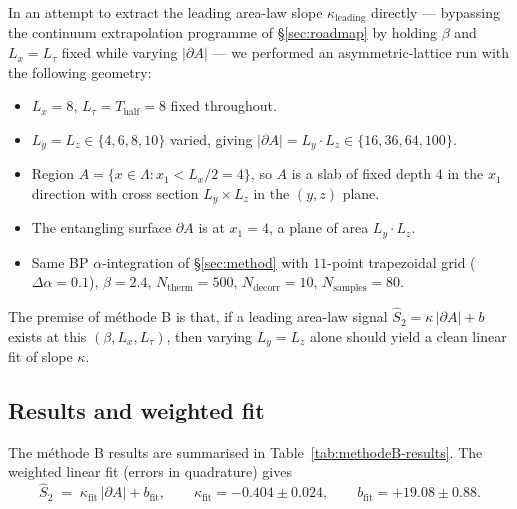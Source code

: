 \documentclass[11pt,a4paper]{article}
\theoremstyle{definition}
\newcommand{\Lat}{\Lambda}
\begin{document}
In an attempt to extract the leading area-law slope
$\kappa_{\mathrm{leading}}$ directly --- bypassing the continuum
extrapolation programme of \S\ref{sec:roadmap} by holding $\beta$
and $L_x = L_\tau$ fixed while varying $|\partial A|$ --- we
performed an asymmetric-lattice run with the following geometry:
\begin{itemize}
   \item $L_x = 8$, $L_\tau = T_{\mathrm{half}} = 8$ fixed throughout.
   \item $L_y = L_z \in \{4, 6, 8, 10\}$ varied, giving
         $|\partial A| = L_y\cdot L_z \in \{16, 36, 64, 100\}$.
   \item Region $A = \{x \in \Lat : x_1 < L_x/2 = 4\}$, so $A$ is a
         slab of fixed depth $4$ in the $x_1$ direction with cross
         section $L_y \times L_z$ in the $(y,z)$ plane.
   \item The entangling surface $\partial A$ is at $x_1 = 4$, a
         plane of area $L_y\cdot L_z$.
   \item Same BP $\alpha$-integration of \S\ref{sec:method} with
         $11$-point trapezoidal grid ($\Delta\alpha = 0.1$), $\beta
         = 2.4$, $N_{\mathrm{therm}} = 500$, $N_{\mathrm{decorr}} =
         10$, $N_{\mathrm{samples}} = 80$.
\end{itemize}
The premise of méthode B is that, if a leading area-law signal
$\widehat S_2 = \kappa\,|\partial A| + b$ exists at this $(\beta,
L_x, L_\tau)$, then varying $L_y = L_z$ alone should yield a clean
linear fit of slope $\kappa$.

\subsection{Results and weighted fit}

The méthode B results are summarised in
Table~\ref{tab:methodeB-results}. The weighted linear fit (errors
in quadrature) gives
\begin{equation}
   \widehat S_2 \;=\; \kappa_{\mathrm{fit}}\,|\partial A| + b_{\mathrm{fit}},
   \qquad
   \kappa_{\mathrm{fit}} = -0.404 \pm 0.024,
   \qquad
   b_{\mathrm{fit}} = +19.08 \pm 0.88.
   \label{eq:methodeB-fit}
\end{equation}
\end{document}
